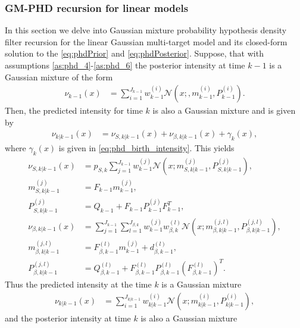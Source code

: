         \subsubsection{GM-PHD recursion for linear models}
In this section we delve into Gaussian mixture probability hypothesis density filter recursion for the linear Gaussian multi-target model and its closed-form solution to the \eqref{eq:phdPrior} and \eqref{eq:phdPosterior}. Suppose, that with assumptions \ref{as:phd_4}-\ref{as:phd_6} the posterior intensity at time $k-1$ is a Gaussian mixture of the form
\begin{align}
    \nu_{k-1}(x) &= \sum_{i=1}^{J_{k-1}} w_{k-1}^{(i)} \mathcal{N}(x;, m_{k-1}^{(i)}, P_{k-1}^{(i)}). \label{eq:phd_recursion_posterior}
\end{align}
Then, the predicted intensity for time $k$ is also a Gaussian mixture and is given by
\begin{align}
    \nu_{k|k-1}(x) &= \nu_{S,k|k-1}(x) + \nu_{\beta, k|k-1}(x) + \gamma_k(x),
    \label{eq:phd_recursion_predict}
\end{align}
where $\gamma_k(x)$ is given in \eqref{eq:phd_birth_intensity}. This yields
\begin{align}
    \nu_{S,k|k-1}(x) &= p_{S,k}\sum_{j=1}^{J_{k-1}}w_{k-1}^{(j)} \mathcal{N}(x;m_{S,k|k-1}^{(j)}, P_{S,k|k-1}^{(j)}) \label{eq:recursion_predict_intensity}, \\
    m_{S,k|k-1}^{(j)} &= F_{k-1}m_{k-1}^{(j)},  \label{eq:recursion_predict_m} \\
    P_{S,k|k-1}^{(j)} &= Q_{k-1} + F_{k-1}P_{k-1}^{(j)}F_{k-1}^T,  \label{eq_recursion_predict_P} \\
    \nu_{\beta,k|k-1}(x) &= \sum_{j=1}^{J_{k-1}} \sum_{l=1}^{J_{\beta,k}} w_{k-1}^{(j)} w_{\beta,k}^{(l)} \mathcal{N}(x;m_{\beta,k|k-1}^{(j, l)},P_{\beta,k|k-1}^{(j,l)}), \\
    m_{\beta,k|k-1}^{(j, l)} &= F_{\beta,k-1}^{(l)} m_{k-1}^{(j)} + d_{\beta,k-1}^{(l)}, \\
    P_{\beta,k|k-1}^{(j, l)} &= Q_{\beta,k-1}^{(l)} + F_{\beta,k-1}^{(l)} P_{\beta,k-1}^{(l)} (F_{\beta,k-1}^{(l)})^T.
\end{align}
Thus the predicted intensity at the time $k$ is a Gaussian mixture
\begin{align}
    \nu_{k|k-1}(x) &= \sum_{i=1}^{J_{k|k-1}}w_{k|k-1}^{(i)} \mathcal{N}(x;m_{k|k-1}^{(i)}, P_{k|k-1}^{(i)}),  \label{eq:recursion_predict_intensity2}
\end{align}
and the posterior intensity at time $k$ is also a Gaussian mixture
